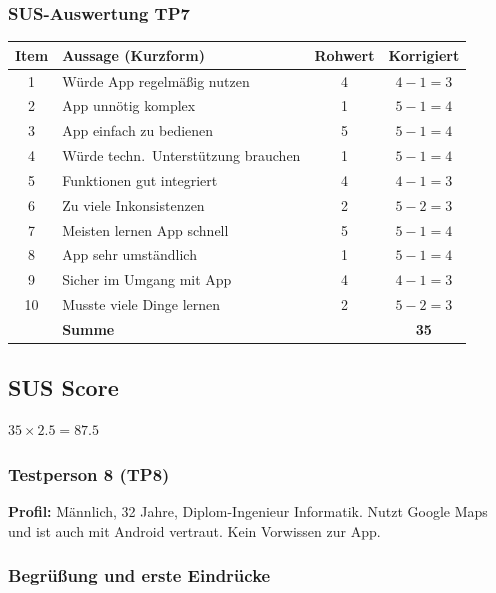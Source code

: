 \documentclass{article}
\begin{document}
\subsubsection*{SUS-Auswertung TP7}

\begin{tabular}{@{}clcc@{}}
  \hline
  \textbf{Item} & \textbf{Aussage (Kurzform)} & \textbf{Rohwert} & \textbf{Korrigiert} \\
  \hline
  1  & Würde App regelmäßig nutzen          & 4 & $4-1=3$ \\
  2  & App unnötig komplex                  & 1 & $5-1=4$ \\
  3  & App einfach zu bedienen              & 5 & $5-1=4$ \\
  4  & Würde techn.\ Unterstützung brauchen & 1 & $5-1=4$ \\
  5  & Funktionen gut integriert            & 4 & $4-1=3$ \\
  6  & Zu viele Inkonsistenzen              & 2 & $5-2=3$ \\
  7  & Meisten lernen App schnell           & 5 & $5-1=4$ \\
  8  & App sehr umständlich                 & 1 & $5-1=4$ \\
  9  & Sicher im Umgang mit App             & 4 & $4-1=3$ \\
  10 & Musste viele Dinge lernen            & 2 & $5-2=3$ \\
  \hline
     & \textbf{Summe}                       &   & \textbf{35} \\
  \hline
\end{tabular}

\subsection*{SUS Score}
$35 \times 2.5 = 87.5$
%
%
\subsubsection*{Testperson 8 (TP8)}

\textbf{Profil:} Männlich, 32 Jahre, Diplom-Ingenieur Informatik. Nutzt Google Maps und ist auch mit Android vertraut. Kein Vorwissen zur App.

\subsubsection*{Begrüßung und erste Eindrücke}
\end{document}
